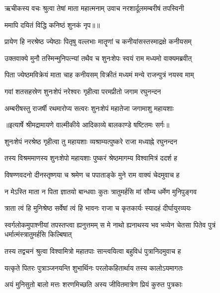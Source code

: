 \twolineshloka
{ऋचीकस्य वचः श्रुत्वा तेषां माता महात्मनाम्}
{उवाच नरशार्दूलमम्बरीषं तपस्विनी} %

{ममापि दयितं विद्धि कनिष्ठं शुनकं नृप॥॥} %

\addtocounter{shlokacount}{1}

\twolineshloka
{प्रायेण हि नरश्रेष्ठ ज्येष्ठाः पितृषु वल्लभाः}
{मातॄणां च कनीयांसस्तस्माद्रक्षे कनीयसम्} %

\twolineshloka
{उक्तवाक्ये मुनौ तस्मिन्मुनिपत्न्यां तथैव च}
{शुनःशेपः स्वयं राम मध्यमो वाक्यमब्रवीत्} %

\twolineshloka
{पिता ज्येष्ठमविक्रेयं माता चाह कनीयसम्}
{विक्रीतं मध्यमं मन्ये राजन्पुत्रं नयस्व माम्} %

\twolineshloka
{गवां शतसहस्रेण शुनःशेपं नरेश्वरः}
{गृहीत्वा परमप्रीतो जगाम रघुनन्दन} %

\twolineshloka
{अम्बरीषस्तु राजर्षी रथमारोप्य सत्वरः}
{शुनःशेपं महातेजा जगामाशु महायशाः} %


{॥इत्यार्षे श्रीमद्रामायणे वाल्मीकीये आदिकाव्ये बालकाण्डे षष्टितमः सर्गः॥}


\twolineshloka
{शुनःशेपं नरश्रेष्ठ गृहीत्वा तु महायशाः}
{व्यश्राम्यत्पुष्करे राजा मध्याह्ने रघुनन्दन} %

\twolineshloka
{तस्य विश्रममाणस्य शुनःशेपो महायशाः}
{पुष्करं श्रेष्ठमागम्य विश्वामित्रं ददर्श ह} %

\twolineshloka
{विषण्णवदनो दीनस्तृष्णया च श्रमेण च}
{पपाताङ्के मुने राम वाक्यं चेदमुवाच ह} %

\twolineshloka
{न मेऽस्ति माता न पिता ज्ञातयो बान्धवाः कुतः}
{त्रातुमर्हसि मां सौम्य धर्मेण मुनिपुङ्गव} %

\twolineshloka
{त्राता त्वं हि मुनिश्रेष्ठ सर्वेषां त्वं हि भावनः}
{राजा च कृतकार्यः स्यादहं दीर्घायुरव्ययः} %

\threelineshloka
{स्वर्गलोकमुपाश्नीयां तपस्तप्त्वा ह्यनुत्तमम्}
{स मे नाथो ह्यनाथस्य भव भव्येन चेतसा}
{पितेव पुत्रं धर्मात्मंस्त्रातुमर्हसि किल्बिषात्} %

\twolineshloka
{तस्य तद्वचनं श्रुत्वा विश्वामित्रो महातपाः}
{सान्त्वयित्वा बहुविधं पुत्रानिदमुवाच ह} %

\twolineshloka
{यत्कृते पितरः पुत्राञ्जनयन्ति शुभार्थिनः}
{परलोकहितार्थाय तस्य कालोऽयमागतः} %

\twolineshloka
{अयं मुनिसुतो बालो मत्तः शरणमिच्छति}
{अस्य जीवितमात्रेण प्रियं कुरुत पुत्रकाः} %

